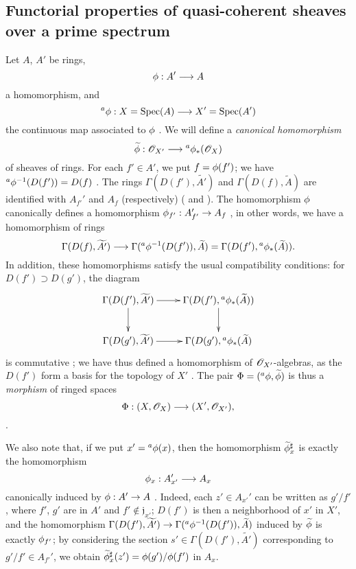 \subsection{Functorial properties of quasi-coherent sheaves over a prime spectrum}
\label{subsection:1.1.6}

\begin{env}[1.6.1]
\label{1.1.6.1}
Let $A$, $A'$ be rings,
\[
  \vphi:A'\to A
\]
a homomorphism, and
\[
  {}^a\vphi:X=\Spec(A)\to X'=\Spec(A')
\]
the continuous map associated to $\phi$ .
We will define a \emph{canonical homomorphism}
\[
  \widetilde{\vphi}:\sh{O}_{X'}\to{}^a\vphi_*(\sh{O}_X)
\]
of sheaves of rings.
For each $f'\in A'$, we put $f=\phi(f')$;
we have ${}^a\phi^{-1}(D(f'))=D(f)$ .
The rings $\Gamma(D(f'),\widetilde{A'})$ and $\Gamma(D(f),\widetilde{A})$ are identified  with $A_{f'}'$ and $A_f$ (respectively) ( and ). The homomorphism $\phi$ canonically defines a homomorphism $\vphi_{f'}:A_{f'}'\to A_f$ , in other words, we have a homomorphism of rings
\[
  \Gamma(D(f),\widetilde{A'})\to\Gamma({}^a\vphi^{-1}(D(f')),\widetilde{A})
  =\Gamma(D(f'),{}^a\vphi_*(\widetilde{A})).
\]
In addition, these homomorphisms satisfy the usual compatibility conditions: for $D(f')\supset D(g')$, the diagram
\[
  \xymatrix{
    \Gamma(D(f'),\widetilde{A'})\ar[r]\ar[d] &
    \Gamma(D(f'),{}^a\vphi_*(\widetilde{A}))\ar[d]\\
    \Gamma(D(g'),\widetilde{A'})\ar[r] &
    \Gamma(D(g'),{}^a\vphi_*(\widetilde{A})
  }
\]
is commutative ;
we have thus defined a homomorphism of $\mathscr{O}_{X'}$-algebras, as the $D(f')$ form a basis for the topology of $X'$ .
The pair $\Phi=({}^a\phi,\widetilde{\phi})$ is thus a \emph{morphism} of ringed spaces
\[
  \Phi:(X,\sh{O}_X)\to(X',\sh{O}_{X'}),
\]
.

We also note that, if we put $x'={}^a\phi(x)$, then the homomorphism $\widetilde{\phi}_x^\sharp$  is exactly the homomorphism
\[
  \vphi_x:A_{x'}'\to A_x
\]
canonically induced by $\vphi:A'\to A$ .
Indeed, each $z'\in A_{x'}'$ can be written as $g'/f'$, where $f'$, $g'$ are in $A'$ and $f'\not\in\mathfrak{j}_{x'}$;
$D(f')$ is then a neighborhood of $x'$ in $X'$, and the homomorphism $\Gamma(D(f'),\widetilde{A'})\to\Gamma({}^a\vphi^{-1}(D(f')),\widetilde{A})$ induced by $\widetilde{\phi}$ is exactly $\phi_{f'}$;
by considering the section $s'\in\Gamma(D(f'),\widetilde{A'})$ corresponding to $g'/f'\in A_{f'}'$, we obtain $\widetilde{\phi}_x^\sharp(z')=\phi(g')/\phi(f')$ in $A_x$.
\end{env}

